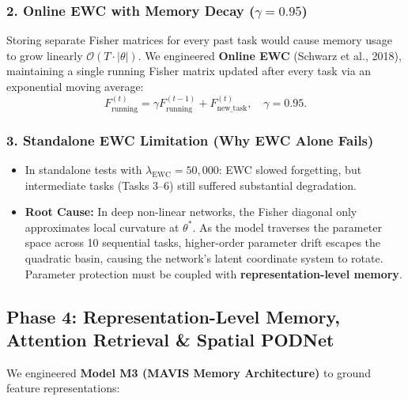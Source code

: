 \documentclass[11pt,a4paper]{article}
\begin{document}
    \subsubsection{2. Online EWC with Memory Decay ($\gamma = 0.95$)}
    Storing separate Fisher matrices for every past task would cause memory usage to grow linearly $\mathcal{O}(T \cdot |\theta|)$. We engineered \textbf{Online EWC} (Schwarz et al., 2018), maintaining a single running Fisher matrix updated after every task via an exponential moving average:
    \begin{equation}
        F_{\text{running}}^{(t)} = \gamma F_{\text{running}}^{(t-1)} + F_{\text{new\_task}}^{(t)}, \quad \gamma = 0.95.
    \end{equation}

    \subsubsection{3. Standalone EWC Limitation (Why EWC Alone Fails)}
    \begin{itemize}[leftmargin=*]
        \item In standalone tests with $\lambda_{\text{EWC}} = 50,000$: EWC slowed forgetting, but intermediate tasks (Tasks 3--6) still suffered substantial degradation.
        \item \textbf{Root Cause:} In deep non-linear networks, the Fisher diagonal only approximates local curvature at $\theta^*$. As the model traverses the parameter space across 10 sequential tasks, higher-order parameter drift escapes the quadratic basin, causing the network's latent coordinate system to rotate. Parameter protection must be coupled with \textbf{representation-level memory}.
    \end{itemize}

    \subsection{Phase 4: Representation-Level Memory, Attention Retrieval \& Spatial PODNet}
    We engineered \textbf{Model M3 (MAVIS Memory Architecture)} to ground feature representations:
\end{document}
